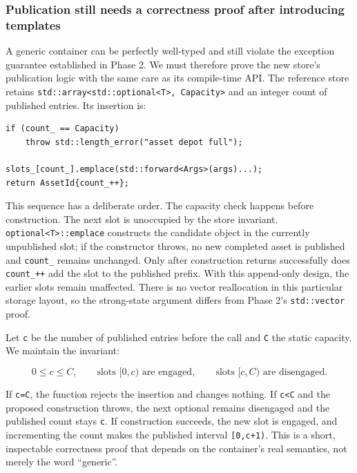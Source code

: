 \subsubsection{Publication still needs a correctness proof after introducing templates}\label{publication-still-needs-a-correctness-proof-after-introducing-templates}

A generic container can be perfectly well-typed and still violate the exception guarantee established in Phase 2. We must therefore prove the new store's publication logic with the same care as its compile-time API. The reference store retains \texttt{std::array\textless{}std::optional\textless{}T\textgreater{},\ Capacity\textgreater{}} and an integer count of published entries. Its insertion is:

\begin{verbatim}
if (count_ == Capacity)
    throw std::length_error("asset depot full");

slots_[count_].emplace(std::forward<Args>(args)...);
return AssetId{count_++};
\end{verbatim}

This sequence has a deliberate order. The capacity check happens before construction. The next slot is unoccupied by the store invariant. \texttt{optional\textless{}T\textgreater{}::emplace} constructs the candidate object in the currently unpublished slot; if the constructor throws, no new completed asset is published and \texttt{count\_} remains unchanged. Only after construction returns successfully does \texttt{count\_++} add the slot to the published prefix. With this append-only design, the earlier slots remain unaffected. There is no vector reallocation in this particular storage layout, so the strong-state argument differs from Phase 2's \texttt{std::vector} proof.

Let \texttt{c} be the number of published entries before the call and \texttt{C} the static capacity. We maintain the invariant:

\[
0\le c\le C,\qquad
\text{slots }[0,c)\text{ are engaged},\qquad
\text{slots }[c,C)\text{ are disengaged}.
\]

If \texttt{c=C}, the function rejects the insertion and changes nothing. If \texttt{c\textless{}C} and the proposed construction throws, the next optional remains disengaged and the published count stays \texttt{c}. If construction succeeds, the new slot is engaged, and incrementing the count makes the published interval \texttt{{[}0,c+1)}. This is a short, inspectable correctness proof that depends on the container's real semantics, not merely the word ``generic''.

